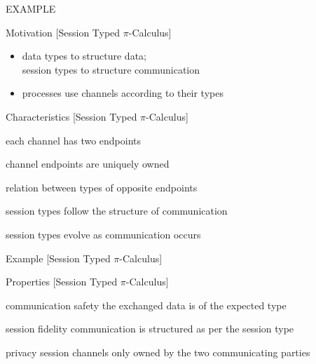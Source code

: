 \documentclass[dvipsnames]{beamer}
\newcommand{\sitem}{\item[\raisebox{.45ex}{\rule{.6ex}{.6ex}}]}
\newcommand{\Picalc}{$\pi$-Calculus}
\newcommand{\slidetitle}[2]{#2 \hspace*{\fill} [#1]}
\begin{document}
  \begin{frame}
  EXAMPLE
  \end{frame}
  
  \begin{frame}{\slidetitle{Session Typed \Picalc{}}{Motivation}}
    \begin{itemize}
      \setlength\itemsep{1em}
      \sitem data types to structure data;\\
             session types to structure communication
      \sitem processes use channels according to their types
    \end{itemize}
  \end{frame}

  \begin{frame}{\slidetitle{Session Typed \Picalc{}}{Characteristics}}
    \begin{description}
      \setlength\itemsep{1em}
      \item[endpoints] each channel has two endpoints
      \item[linearity] channel endpoints are uniquely owned
      \item[duality] relation between types of opposite endpoints
      \item[structure] session types follow the structure of communication
      \item[change] session types evolve as communication occurs
    \end{description}
  \end{frame}

  \begin{frame}{\slidetitle{Session Typed \Picalc{}}{Example}}
  \end{frame}

  \begin{frame}{\slidetitle{Session Typed \Picalc{}}{Properties}}
    \begin{block}{communication safety}
      the exchanged data is of the expected type
    \end{block}
    \begin{block}{session fidelity}
      communication is structured as per the session type
    \end{block}
    \begin{block}{privacy}
      session channels only owned by the two communicating parties
    \end{block}
  \end{frame}
\end{document}
